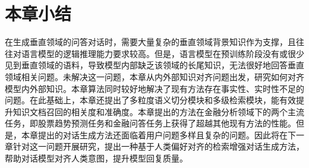 \section{本章小结}

在生成垂直领域的问答对话时，需要大量复杂的垂直领域背景知识作为支撑，且往往对语言模型的逻辑推理能力要求较高。但是，语言模型在预训练阶段没有或很少见到垂直领域的语料，导致模型内部缺乏该领域的长尾知识，无法很好地回答垂直领域相关问题。未解决这一问题，本章从内外部知识对齐问题出发，研究如何对齐模型内外部知识。本章算法同时较好地解决了现有方法存在事实性、实时性不足的问题。在此基础上，本章还提出了多粒度语义切分模块和多级检索模块，能有效提升知识文档召回的相关度和准确度。本章提出的方法在金融分析领域下的两个主流任务，即股票趋势预测任务和金融问答任务上获得了超越其他现有方法的性能。但是，本章提出的对话生成方法还面临着用户问题多样且复杂的问题。因此将在下一章针对这一问题开展研究，提出一种基于人类偏好对齐的检索增强对话生成方法，帮助对话模型对齐人类意图，提升模型回复质量。
